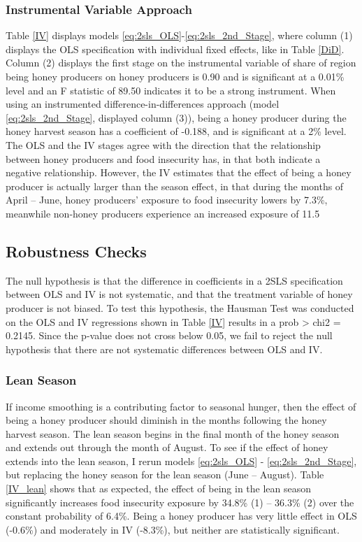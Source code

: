 \documentclass[../main.tex]{subfiles}
\begin{document}
\subsubsection{Instrumental Variable Approach}

Table \ref{IV} displays models \ref{eq:2sls_OLS}-\ref{eq:2sls_2nd_Stage}, where column (1) displays the OLS specification with individual fixed effects, like in Table \ref{DiD}. Column (2) displays the first stage on the instrumental variable of share of region being honey producers on honey producers is 0.90 and is significant at a 0.01\% level and an F statistic of 89.50 indicates it to be a strong instrument. When using an instrumented difference-in-differences approach (model \ref{eq:2sls_2nd_Stage}, displayed column (3)), being a honey producer during the honey harvest season has a coefficient of -0.188, and is significant at a 2\% level. The OLS and the IV stages agree with the direction that the relationship between honey producers and food insecurity has, in that both indicate a negative relationship. However, the IV estimates that the effect of being a honey producer is actually larger than the season effect, in that during the months of April – June, honey producers’ exposure to food insecurity lowers by 7.3\%, meanwhile non-honey producers experience an increased exposure of 11.5%

\subsection{Robustness Checks}

The null hypothesis is that the difference in coefficients in a 2SLS specification between OLS and IV is not systematic, and that the treatment variable of honey producer is not biased. To test this hypothesis, the Hausman Test was conducted on the OLS and IV regressions shown in Table \ref{IV} results in a prob > chi2 = 0.2145. Since the p-value does not cross below 0.05, we fail to reject the null hypothesis that there are not systematic differences between OLS and IV. 

\subsubsection{Lean Season}

If income smoothing is a contributing factor to seasonal hunger, then the effect of being a honey producer should diminish in the months following the honey harvest season. The lean season begins in the final month of the honey season and extends out through the month of August. To see if the effect of honey extends into the lean season, I rerun models \ref{eq:2sls_OLS} - \ref{eq:2sls_2nd_Stage}, but replacing the honey season for the lean season (June – August). Table \ref{IV_lean} shows that as expected, the effect of being in the lean season significantly increases food insecurity exposure by 34.8\% (1) – 36.3\% (2) over the constant probability of 6.4\%. Being a honey producer has very little effect in OLS (-0.6\%) and moderately in IV (-8.3\%), but neither are statistically significant. 
\end{document}
